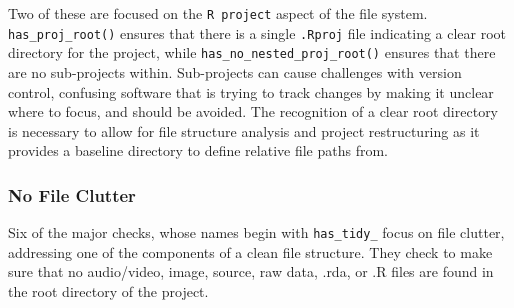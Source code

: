 \documentclass[12pt,twoside]{reedthesis}
\begin{document}
Two of these are focused on the \texttt{R\ project} aspect of the file system. \texttt{has\_proj\_root()} ensures that there is a single \texttt{.Rproj} file indicating a clear root directory for the project, while \texttt{has\_no\_nested\_proj\_root()} ensures that there are no sub-projects within. Sub-projects can cause challenges with version control, confusing software that is trying to track changes by making it unclear where to focus, and should be avoided. The recognition of a clear root directory is necessary to allow for file structure analysis and project restructuring as it provides a baseline directory to define relative file paths from.

\hypertarget{no-file-clutter}{%
\subsubsection{No File Clutter}\label{no-file-clutter}}

Six of the major checks, whose names begin with \texttt{has\_tidy\_} focus on file clutter, addressing one of the components of a clean file structure. They check to make sure that no audio/video, image, source, raw data, .rda, or .R files are found in the root directory of the project.
\end{document}
